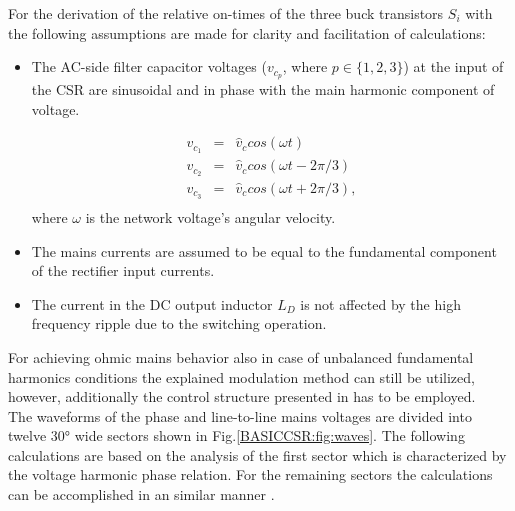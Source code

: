 For the derivation of the relative on-times of the three buck transistors $S_i$ with the following assumptions are made for clarity and facilitation of calculations:
\begin{itemize}
	\item The AC-side filter capacitor voltages ($v_{c_p}$, where $p\in\{1,2,3\}$) at the input of the CSR are sinusoidal and in phase with the main harmonic component of voltage.
	
	\begin{equation}
        \begin{array}{rcl}
            v_{c_1}&=&\widehat{v}_ccos(\omega t)\\
						v_{c_2}&=&\widehat{v}_ccos(\omega t-2\pi/3)\\
						v_{c_3}&=&\widehat{v}_ccos(\omega t+2\pi/3),\\
        \end{array}
        \label{BASICMPC:equ:basic_LTI}
    \end{equation}
	where $\omega$ is the network voltage's angular velocity.
	
	\item The mains currents are assumed to be equal to the fundamental component of the rectifier input currents.
	\item The current in the DC output inductor $L_{D}$ is not affected by the high frequency ripple due to the switching operation.
\end{itemize}

 For achieving ohmic mains behavior also in case of unbalanced fundamental harmonics conditions the explained modulation method can still be utilized, however, additionally the control structure presented in \cite{baumann2005novel} has to be employed.\\
The waveforms of the phase and line-to-line mains voltages are divided into twelve $30°$ wide sectors shown in Fig.\ref{BASICCSR:fig:waves}. The following calculations are based on the analysis of the first sector which is characterized by the voltage harmonic phase relation. For the remaining sectors the calculations can be accomplished in an similar manner \cite{nussbaumer2007comprehensive}.

